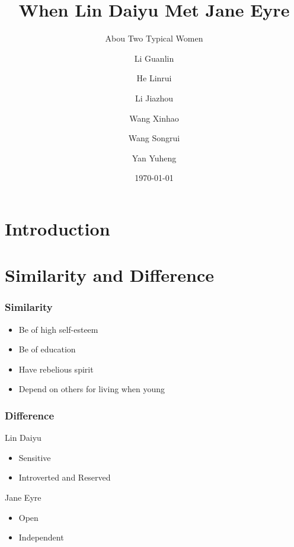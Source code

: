 \documentclass{beamer}
\title[About Women]
{When Lin Daiyu Met Jane Eyre}
\subtitle{Abou Two Typical Women}
\author[] %
{Li Guanlin\inst{1} \and He Linrui\inst{1} \and Li Jiazhou \inst{1} \and Wang Xinhao \inst{1} \and Wang Songrui \inst{1}\and Yan Yuheng \inst{1}}
\institute[NJU] %
{
\inst{1}%
Undergraduates of ICS\\
Nanjing University
}
\date[NJU 2023] %
{\today}
\begin{document}
\begin{frame}
    \titlepage
    \begin{figure}[htpb]
    \end{figure}
\end{frame}

\begin{frame}
    \tableofcontents[sectionstyle=show,subsectionstyle=show/shaded/hide,subsubsectionstyle=show/shaded/hide]
\end{frame}

\section{Introduction}

\section{Similarity and Difference}

\begin{frame}
    \frametitle{Similarity}
    \Large
    \begin{itemize}[<+->]
        \item Be of high self-esteem
        \item Be of education
        \item Have rebelious spirit
        \item Depend on others for living when young
    \end{itemize}
\end{frame}

\begin{frame}
    \frametitle{Difference}
    \Large
    \begin{block}{Lin Daiyu}
        \begin{itemize}
            \item Sensitive
            \item Introverted and Reserved
        \end{itemize}        
    \end{block}
    \begin{block}{Jane Eyre}
        \begin{itemize}
            \item Open 
            \item Independent
        \end{itemize}
    \end{block}
\end{frame}
\end{document}
